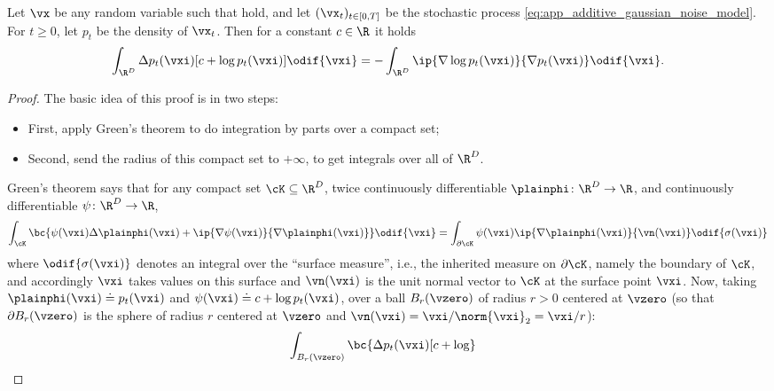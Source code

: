 \documentclass[../../book-main.tex]{subfiles}
\begin{document}
\begin{lemma}\label{lem:diffusion_ibp}
    Let \(\vx\) be any random variable such that
    hold, and let \((\vx_{t})_{t \in [0, T]}\) be the stochastic
    process \eqref{eq:app_additive_gaussian_noise_model}. For \(t
    \geq 0\), let \(p_{t}\) be the density of \(\vx_{t}\). Then for a
    constant \(c \in \R\) it holds
    \begin{equation}
        \int_{\R^{D}}\Delta p_{t}(\vxi)[c + \log
        p_{t}(\vxi)]\odif{\vxi} = -\int_{\R^{D}}\ip{\nabla \log
        p_{t}(\vxi)}{\nabla p_{t}(\vxi)}\odif{\vxi}.
    \end{equation}
\end{lemma}
\begin{proof}
    The basic idea of this proof is in two steps:
    \begin{itemize}
        \item First, apply Green's theorem to do integration by parts
            over a compact set;
        \item Second, send the radius of this compact set to
            \(+\infty\), to get integrals over all of \(\R^{D}\).
    \end{itemize}
    Green's theorem says that for any compact set \(\cK \subseteq
    \R^{D}\), twice continuously differentiable \(\plainphi \colon
    \R^{D} \to \R\), and continuously differentiable \(\psi \colon
    \R^{D} \to \R\),
    \begin{equation}
        \int_{\cK}\bc{\psi(\vxi) \Delta \plainphi(\vxi) + \ip{\nabla
        \psi(\vxi)}{\nabla \plainphi(\vxi)}}\odif{\vxi} =
        \int_{\partial \cK}\psi(\vxi)\ip{\nabla
        \plainphi(\vxi)}{\vn(\vxi)}\odif{\sigma(\vxi)}
    \end{equation}
    where \(\odif{\sigma(\vxi)}\) denotes an integral over the
    ``surface measure'', i.e., the inherited measure on \(\partial
    \cK\), namely the boundary of \(\cK\), and accordingly \(\vxi\)
    takes values on this surface and \(\vn(\vxi)\) is the unit normal
    vector to \(\cK\) at the surface point \(\vxi\). Now, taking
    \(\plainphi(\vxi) \doteq p_{t}(\vxi)\) and \(\psi(\vxi) \doteq c
    + \log p_{t}(\vxi)\), over a ball \(B_{r}(\vzero)\) of radius \(r
    > 0\) centered at \(\vzero\) (so that \(\partial B_{r}(\vzero)\)
        is the sphere of radius \(r\) centered at \(\vzero\) and
    \(\vn(\vxi) = \vxi/\norm{\vxi}_{2} = \vxi/r\)):
    \begin{align}
        &\int_{B_{r}(\vzero)}\bc{\Delta p_{t}(\vxi)[c + \log
}
\end{align}
\end{proof}
\end{document}
